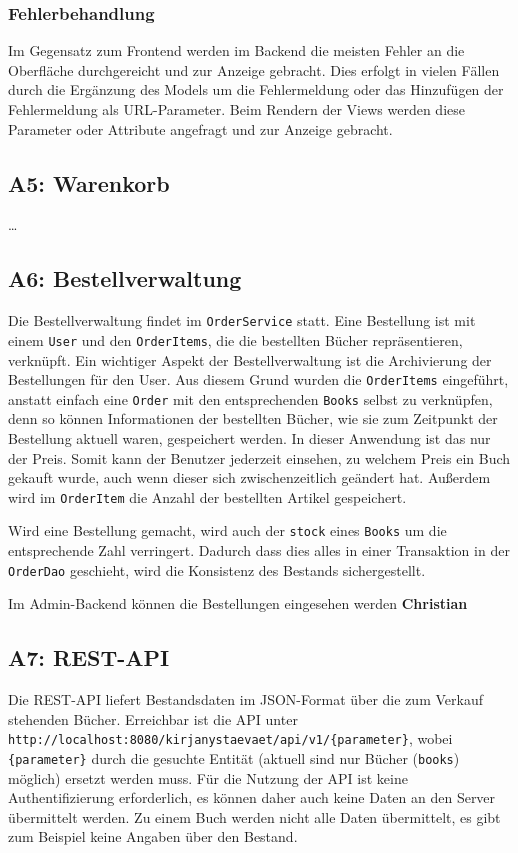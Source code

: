 		\subsubsection{Fehlerbehandlung}
		Im Gegensatz zum Frontend werden im Backend die meisten Fehler an die Oberfläche durchgereicht und zur Anzeige gebracht. Dies erfolgt in vielen Fällen durch die Ergänzung des Models um die Fehlermeldung oder das Hinzufügen der Fehlermeldung als URL-Parameter. Beim Rendern der Views werden diese Parameter oder Attribute angefragt und zur Anzeige gebracht.
	
	\subsection{A5: Warenkorb}\label{sec:umsetzung:cart}
	\dots
	
	\subsection{A6: Bestellverwaltung}\label{sec:umsetzung:Bestellverwaltung}
	Die Bestellverwaltung findet im \texttt{OrderService} statt. Eine Bestellung ist mit einem \texttt{User} und den \texttt{OrderItems}, die die bestellten Bücher repräsentieren, verknüpft. Ein wichtiger Aspekt der Bestellverwaltung ist die Archivierung der Bestellungen für den User. Aus diesem Grund wurden die \texttt{OrderItems} eingeführt, anstatt einfach eine \texttt{Order} mit den entsprechenden \texttt{Books} selbst zu verknüpfen, denn so können Informationen der bestellten Bücher, wie sie zum Zeitpunkt der Bestellung aktuell waren, gespeichert werden. In dieser Anwendung ist das nur der Preis. Somit kann der Benutzer jederzeit einsehen, zu welchem Preis ein Buch gekauft wurde, auch wenn dieser sich zwischenzeitlich geändert hat. Außerdem wird im \texttt{OrderItem} die Anzahl der bestellten Artikel gespeichert.
	
	Wird eine Bestellung gemacht, wird auch der \texttt{stock} eines \texttt{Books} um die entsprechende Zahl verringert. Dadurch dass dies alles in einer Transaktion in der \texttt{OrderDao} geschieht, wird die Konsistenz des Bestands sichergestellt.
	
	Im Admin-Backend können die Bestellungen eingesehen werden \textbf{Christian}
	
	\subsection{A7: REST-API}\label{sec:umsetzung:API}
	Die REST-API liefert Bestandsdaten im JSON-Format über die zum Verkauf stehenden Bücher. Erreichbar ist die API unter \lstinline|http://localhost:8080/kirjanystaevaet/api/v1/{parameter}|, wobei \lstinline|{parameter}| durch die gesuchte Entität (aktuell sind nur Bücher (\lstinline|books|) möglich) ersetzt werden muss. Für die Nutzung der API ist keine Authentifizierung erforderlich, es können daher auch keine Daten an den Server übermittelt werden. Zu einem Buch werden nicht alle Daten übermittelt, es gibt zum Beispiel keine Angaben über den Bestand.
	

